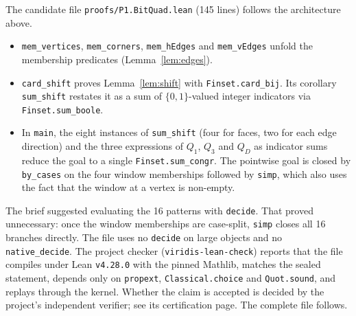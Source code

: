 \documentclass[11pt]{article}
\theoremstyle{definition}
\theoremstyle{remark}
\begin{document}
The candidate file \texttt{proofs/P1.BitQuad.lean} (145 lines) follows the
architecture above.
\begin{itemize}
\item \texttt{mem\_vertices}, \texttt{mem\_corners}, \texttt{mem\_hEdges} and
  \texttt{mem\_vEdges} unfold the membership predicates (Lemma~\ref{lem:edges}).
\item \texttt{card\_shift} proves Lemma~\ref{lem:shift} with
  \texttt{Finset.card\_bij}. Its corollary \texttt{sum\_shift} restates it as a
  sum of $\{0,1\}$-valued integer indicators via \texttt{Finset.sum\_boole}.
\item In \texttt{main}, the eight instances of \texttt{sum\_shift} (four for
  faces, two for each edge direction) and the three expressions of $Q_1$, $Q_3$
  and $Q_D$ as indicator sums reduce the goal to a single
  \texttt{Finset.sum\_congr}. The pointwise goal is closed by
  \texttt{by\_cases} on the four window memberships followed by \texttt{simp},
  which also uses the fact that the window at a vertex is non-empty.
\end{itemize}
The brief suggested evaluating the 16 patterns with \texttt{decide}. That
proved unnecessary: once the window memberships are case-split, \texttt{simp}
closes all 16 branches directly. The file uses no \texttt{decide} on large
objects and no \texttt{native\_decide}. The project checker
(\texttt{viridis-lean-check}) reports that the file compiles under Lean
\texttt{v4.28.0} with the pinned Mathlib, matches the sealed statement, depends
only on \texttt{propext}, \texttt{Classical.choice} and \texttt{Quot.sound}, and
replays through the kernel. Whether the claim is accepted is decided by the
project's independent verifier; see its certification page. The complete file
follows.
\end{document}
